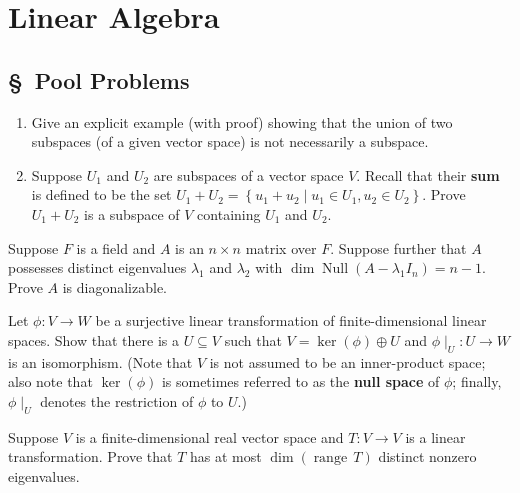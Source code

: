 \documentclass[11pt,twoside,openany]{memoir}
\begin{document}
\chapter*{Linear Algebra}
    \section*{\S\ Pool Problems}
    \begin{exercise}
        \phantom{a}
        \begin{enumerate}[label=(\alph*)]
            \item Give an explicit example (with proof) showing that the union of two subspaces (of a given vector space) is not necessarily a subspace.
            \item Suppose $U_1$ and $U_2$ are subspaces of a vector space $V$. Recall that their \textbf{sum} is defined to be the set $U_1+U_2 = \left\{ u_1 + u_2 \mid u_1 \in U_1, u_2 \in U_2 \right\}$. Prove $U_1 + U_2$ is a subspace of $V$ containing $U_1$ and $U_2$.
        \end{enumerate}
        \end{exercise}
        
        \begin{exercise}
        Suppose $F$ is a field and $A$ is an $n\times n$ matrix over $F$. Suppose further that $A$ possesses distinct eigenvalues $\lambda_1$ and $\lambda_2$ with $\dim \operatorname{Null}(A-\lambda_1 I_n)=n-1$. Prove $A$ is diagonalizable.
        \end{exercise}
        
        \begin{exercise}
        Let $\phi: V \to W$ be a surjective linear transformation of finite-dimensional linear spaces. Show that there is a $U \subseteq V$ such that $V = \ker(\phi) \oplus U$ and $\phi\mid_U : U \to W$ is an isomorphism. (Note that $V$ is not assumed to be an inner-product space; also note that $\ker(\phi)$ is sometimes referred to as the \textbf{null space} of $\phi$; finally, $\phi\mid_U$ denotes the restriction of $\phi$ to $U$.)
        \end{exercise}
        
        \begin{exercise}
        Suppose $V$ is a finite-dimensional real vector space and $T: V \to V$ is a linear transformation. Prove that $T$ has at most $\dim(\operatorname{range} \, T)$ distinct nonzero eigenvalues.
        \end{exercise}
        
\end{document}
